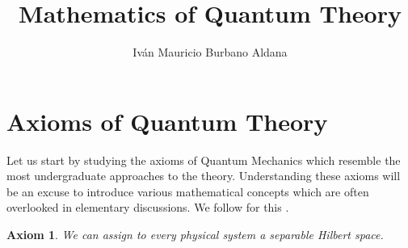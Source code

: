 \documentclass{article}
\title{Mathematics of Quantum Theory}
\author{Iván Mauricio Burbano Aldana}
\newtheorem{axiom}{Axiom}
\begin{document}
\maketitle

\section{Axioms of Quantum Theory}

Let us start by studying the axioms of Quantum Mechanics which resemble the most undergraduate approaches to the theory. Understanding these axioms will be an excuse to introduce various mathematical concepts which are often overlooked in elementary discussions. We follow for this \cite{Hall2013}.

\begin{axiom}
We can assign to every physical system a separable Hilbert space.
\end{axiom}
\end{document}
